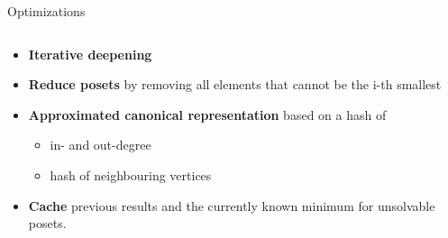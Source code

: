 \begin{frame}{Optimizations}
  \begin{columns}
    \begin{column}{0.6\textwidth}
      \begin{itemize}
        \item<1-> \textbf{Iterative deepening}
        \item<2-> \textbf{Reduce posets} by removing all elements that cannot be the i-th smallest
        \item<3-> \textbf{Approximated canonical representation} based on a hash of 
        \begin{itemize}
          \item in- and out-degree
          \item hash of neighbouring vertices 
        \end{itemize}
        \item<4-> \textbf{Cache} previous results and the currently known minimum for unsolvable posets.
      \end{itemize}
    \end{column}

    \begin{column}{0.4\textwidth}
\end{column}
\end{columns}
\end{frame}
